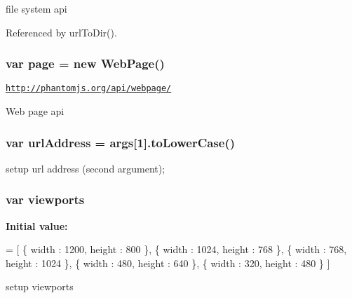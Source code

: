 file system api 

Referenced by url\+To\+Dir().

\subsubsection[{\texorpdfstring{page}{page}}]{\setlength{\rightskip}{0pt plus 5cm}var page = new Web\+Page()}\hypertarget{responsive-screenshot_8js_a85d8b1b97106b359e1c9ee119ebe5832}{}\label{responsive-screenshot_8js_a85d8b1b97106b359e1c9ee119ebe5832}
\href{http://phantomjs.org/api/webpage/}{\tt http\+://phantomjs.\+org/api/webpage/}

Web page api 
\subsubsection[{\texorpdfstring{url\+Address}{urlAddress}}]{\setlength{\rightskip}{0pt plus 5cm}var url\+Address = {\bf args}\mbox{[}1\mbox{]}.to\+Lower\+Case()}\hypertarget{responsive-screenshot_8js_a5acdc5bac87276538445379382dba523}{}\label{responsive-screenshot_8js_a5acdc5bac87276538445379382dba523}
setup url address (second argument); 
\subsubsection[{\texorpdfstring{viewports}{viewports}}]{\setlength{\rightskip}{0pt plus 5cm}var viewports}\hypertarget{responsive-screenshot_8js_a00da385fc9be9cb4e2d703a1fc928ef1}{}\label{responsive-screenshot_8js_a00da385fc9be9cb4e2d703a1fc928ef1}
{\bfseries Initial value\+:}
\begin{DoxyCode}
= [
    \{
        width : 1200,
        height : 800
    \},
    \{
        width : 1024,
        height : 768
    \},
    \{
        width : 768,
        height : 1024
    \},
    \{
        width : 480,
        height : 640
    \},
    \{
        width : 320,
        height : 480
    \}
]
\end{DoxyCode}
setup viewports 